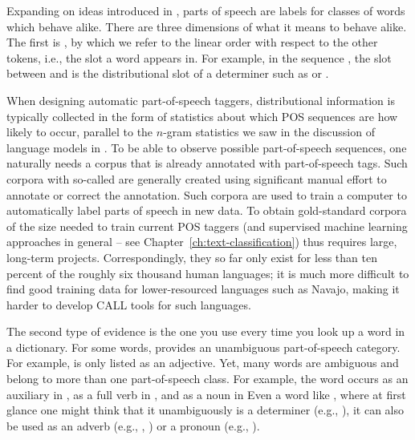 
Expanding on ideas introduced in , parts of speech are labels for classes of words
which behave alike. There are three dimensions of what it means to behave alike.
The first is , by which we refer to the linear
order with respect to the other tokens, i.e., the slot a word appears
in. For example, in the sequence , the slot between  and
 is the distributional slot of a determiner such as
 or .

When designing automatic part-of-speech  taggers, distributional information is
typically collected in the form of statistics about which POS
sequences are how likely to occur, parallel to the $n$-gram statistics
we saw in the discussion of language models in .
  To be able to observe possible part-of-speech
sequences, one naturally needs a corpus that is already annotated with
part-of-speech tags. Such corpora with so-called  are generally created using significant manual effort to
annotate or correct the annotation. Such corpora are used to train a computer to automatically label parts of speech in new data.  
To obtain gold-standard corpora of
the size needed to train current POS taggers (and supervised machine
learning approaches in general -- see
Chapter~\ref{ch:text-classification}) thus requires large,
long-term projects. Correspondingly, they so far only exist for less than ten percent of the roughly six thousand human languages; it is much more difficult to find good training data for lower-resourced languages such as Navajo, making it harder to develop CALL tools for such languages.
 

The second type of evidence is the one you use every time you look up
a word in a dictionary. For some words, 
provides an unambiguous part-of-speech category. For example,
 is only listed as an adjective. Yet, many
words are ambiguous and belong to more than one part-of-speech
class. For example, the word  occurs as an auxiliary in
, as a full verb in , and as a noun in 
Even a word like , where at first glance one might think
that it unambiguously is a determiner (e.g., ), it can also be used as an adverb (e.g., ,
) or a pronoun (e.g., ). 


